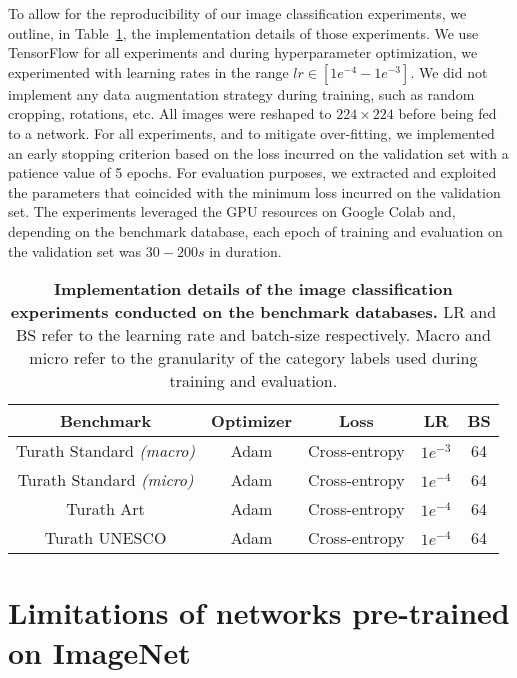 \documentclass{article}
\begin{document}
To allow for the reproducibility of our image classification experiments, we outline, in Table~\ref{table:implementation_details}, the implementation details of those experiments. We use TensorFlow \cite{Abadi2016} for all experiments and during hyperparameter optimization, we experimented with learning rates in the range $lr \in [1e^{-4} - 1e^{-3}]$. We did not implement any data augmentation strategy during training, such as random cropping, rotations, etc. All images were reshaped to $224 \times 224$ before being fed to a network. For all experiments, and to mitigate over-fitting, we implemented an early stopping criterion based on the loss incurred on the validation set with a patience value of 5 epochs. For evaluation purposes, we extracted and exploited the parameters that coincided with the minimum loss incurred on the validation set. The experiments leveraged the GPU resources on Google Colab and, depending on the benchmark database, each epoch of training and evaluation on the validation set was $30-200s$ in duration. 

\begin{table}[!h]
    \centering
    \caption{\textbf{Implementation details of the image classification experiments conducted on the benchmark databases.} LR and BS refer to the learning rate and batch-size respectively. Macro and micro refer to the granularity of the category labels used during training and evaluation.}
    \label{table:implementation_details}
    \begin{tabular}{c|c c c c}
         \toprule
         Benchmark & Optimizer & Loss & LR & BS \\
         \midrule
         Turath Standard \textit{(macro)} & Adam & Cross-entropy & $1e^{-3}$ & 64 \\
         Turath Standard \textit{(micro)} & Adam & Cross-entropy & $1e^{-4}$ & 64 \\
         Turath Art & Adam & Cross-entropy & $1e^{-4}$ & 64 \\
         Turath UNESCO & Adam & Cross-entropy & $1e^{-4}$ & 64 \\
         \bottomrule
    \end{tabular}
\end{table}

\section{Limitations of networks pre-trained on ImageNet}
\label{appendix:network_limitations}
\end{document}
